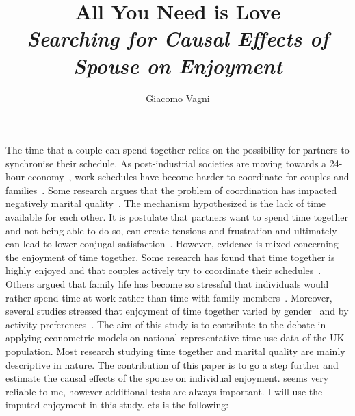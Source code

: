 \documentclass[doc, twocolumn]{apa}[12pt]
\author{Giacomo Vagni}
\title{All You Need is Love \\ \emph{Searching for Causal Effects of Spouse on Enjoyment}}
\affiliation{PhD Student \\ University of Oxford \\ Nuffield College}
\begin{document}
	\maketitle
	\newpage 

\twocolumn 

%

The time that a couple can spend together relies on the possibility for partners to synchronise their schedule. As post-industrial societies are moving towards a 24-hour economy~\cite{presser2005working}, work schedules have become harder to coordinate for couples and families~\cite{Lesnard2009-kl}. Some research argues that the problem of coordination has impacted negatively marital quality~\cite{Mills2010-ux}. The mechanism hypothesized is the lack of time available for each other. It is postulate that partners want to spend time together and not being able to do so, can create tensions and frustration and ultimately can lead to lower conjugal satisfaction~\cite{hill1988marital}. However, evidence is mixed concerning the enjoyment of time together. Some research has found that time together is highly enjoyed and that couples actively try to coordinate their schedules~\cite{Sullivan1996-pa, Flood2016-qz}. Others argued that family life has become so stressful that individuals would rather spend time at work rather than time with family members~\cite{Hochschild2012-yd}. Moreover, several studies stressed that enjoyment of time together varied by gender~\cite{Milkie1999-su} and by activity preferences~\cite{Crawford2002-hy}. The aim of this study is to contribute to the debate in applying econometric models on national representative time use data of the UK population. Most research studying time together and marital quality are mainly descriptive in nature. The contribution of this paper is to go a step further and estimate the causal effects of the spouse on individual enjoyment. 
seems very reliable to me, however additional tests are always important. I will use the imputed enjoyment in this study. cts is the following: 
\end{document}
